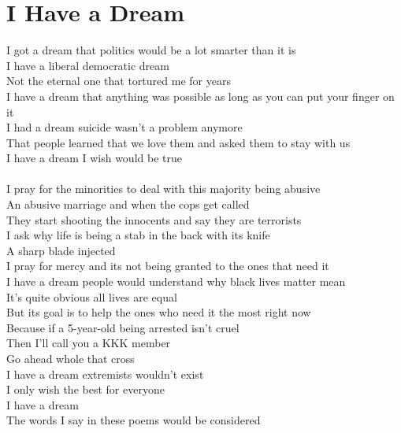 \documentclass[12pt, b5paper, oneside]{book}
\begin{document}
\section{I Have a Dream}
I got a dream that politics would be a lot smarter than it is
\\I have a liberal democratic dream
\\Not the eternal one that tortured me for years
\\I have a dream that anything was possible as long as you can put your finger on it
\\I had a dream suicide wasn't a problem anymore
\\That people learned that we love them and asked them to stay with us
\\I have a dream I wish would be true
%
\\\\I pray for the minorities to deal with this majority being abusive
\\An abusive marriage and when the cops get called
\\They start shooting the innocents and say they are terrorists
\\I ask why life is being a stab in the back with its knife
\\A sharp blade injected
\\I pray for mercy and its not being granted to the ones that need it
\\I have a dream people would understand why black lives matter mean
\\It's quite obvious all lives are equal
\\But its goal is to help the ones who need it the most right now
\\Because if a 5-year-old being arrested isn't cruel
\\Then I'll call you a KKK member
\\Go ahead whole that cross
\\I have a dream extremists wouldn't exist
\\I only wish the best for everyone
\\I have a dream
\\The words I say in these poems would be considered 
\newpage
\end{document}

